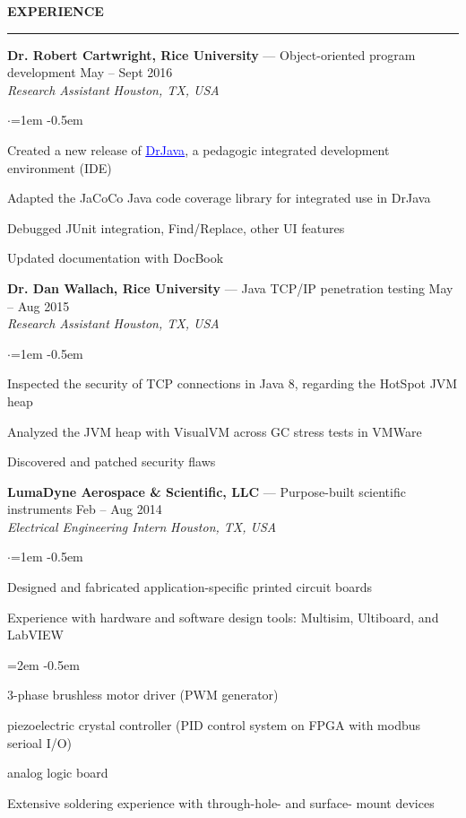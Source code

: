 \documentclass[10pt, a4paper]{article}
\newenvironment{aSection}[1]{
    \medskip \textbf{\uppercase{#1}}
    \smallskip
    \hrule
    \begin{list}{}{
            \setlength{\leftmargin}{1.5em}
        }
    \item[]
    }{
    \end{list}
}
\newenvironment{aSubsection}[4]{
    {#1} \hfill {#2} \\
    \textit{#3} \hfill \textit{#4}
    \smallskip
    \begin{list}{$\cdot$}{\leftmargin=1em}
    \itemsep -0.5em \vspace{-0.5em}
    }{
    \end{list}
    \vspace{0.5em}
}
\begin{document}
\begin{aSection}{Experience}
    \begin{aSubsection}
        {\textbf{Dr. Robert Cartwright, Rice University} --- Object-oriented program development}
        {May -- Sept 2016}
        {Research Assistant}
        {Houston, TX, USA}
    \item Created a new release of
        \href{http://www.drjava.org}{\textcolor{blue}{\underline{DrJava}}}, a pedagogic integrated
        development environment (IDE)
    \item Adapted the JaCoCo Java code coverage library for integrated use in DrJava
    \item Debugged JUnit integration, Find/Replace, other UI features
    \item Updated documentation with DocBook
    \end{aSubsection}

    \begin{aSubsection}
        {\textbf{Dr. Dan Wallach, Rice University} --- Java TCP/IP penetration testing}
        {May -- Aug 2015}
        {Research Assistant}
        {Houston, TX, USA}
    \item Inspected the security of TCP connections in Java 8, regarding the HotSpot JVM heap
    \item Analyzed the JVM heap with VisualVM across GC stress tests in VMWare
    \item Discovered and patched security flaws
    \end{aSubsection}

    \begin{aSubsection}
        {\textbf{LumaDyne Aerospace \& Scientific, LLC} --- Purpose-built scientific
        instruments}
        {Feb -- Aug 2014}
        {Electrical Engineering Intern}
        {Houston, TX, USA}
    \item Designed and fabricated application-specific printed circuit boards
    \item Experience with hardware and software design tools: Multisim, Ultiboard, and LabVIEW
        \begin{list}{\raisebox{.4ex}{\tiny$\succ$}}{\leftmargin=2em}
            \itemsep -0.5em \vspace{-0.5em}
            \item 3-phase brushless motor driver (PWM generator)
            \item piezoelectric crystal controller (PID control system on FPGA
                with modbus serioal I/O)
            \item analog logic board
        \end{list}
    \item Extensive soldering experience with through-hole- and surface-
        mount devices
    \end{aSubsection}
\end{aSection}
\end{document}
